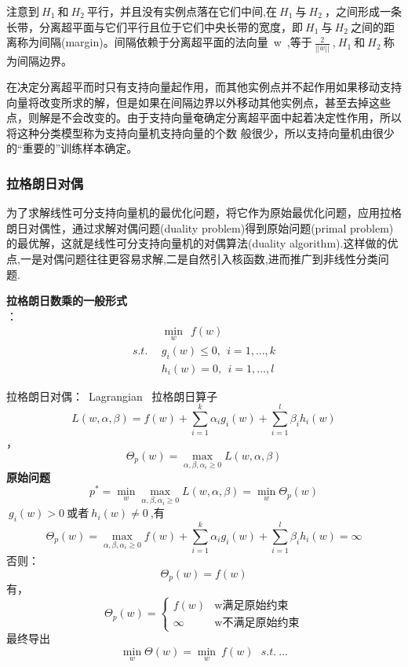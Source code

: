 注意到$~H_1~$和$~H_2~$平行，并且没有实例点落在它们中间,在$~H_1~$与$~H_2~$，之间形成一条长带，分离超平面与它们平行且位于它们中央长带的宽度，即$~H_1~$与$~H_2~$之间的距离称为间隔(margin)。间隔依赖于分离超平面的法向量~w~,等于$~\frac{2}{||w||}~$,$~H_1~$和$~H_2~$称为间隔边界。

在决定分离超平而时只有支持向量起作用，而其他实例点并不起作用如果移动支持向量将改变所求的解，但是如果在间隔边界以外移动其他实例点，甚至去掉这些点，则解是不会改变的。由于支持向量奄确定分离超平面中起着决定性作用，所以将这种分类模型称为支持向量机支持向量的个数 般很少，所以支持向量机由很少的“重要的”训练样本确定。

\subsubsection{拉格朗日对偶}
为了求解线性可分支持向量机的最优化问题，将它作为原始最优化问题，应用拉格朗日对偶性，通过求解对偶问题(duality problem)得到原始问题(primal problem)的最优解，这就是线性可分支持向量机的对偶算法(duality algorithm).这样做的优点,一是对偶问题往往更容易求解,二是自然引入核函数,进而推广到非线性分类问题.

\textbf{拉格朗日数乘的一般形式}
\\ ：
\begin{align}
            &\min \limits_w ~~f(w)   \nonumber \\
    s.t.~~  &g_i(w)\leq0,~~i=1,...,k\nonumber\\
            &h_i(w) = 0,~~i=1,...,l\nonumber
\end{align}

拉格朗日对偶：~Lagrangian~ 拉格朗日算子
$$L(w,\alpha,\beta)=f(w)+\sum_{i=1}^{k}\alpha_ig_i(w)+\sum_{i=1}^{l}\beta_ih_i(w)$$
，
$$\Theta_p(w) = \max \limits_{\alpha,\beta,\alpha_i\geq0} L(w,\alpha,\beta)$$
\indent\textbf{原始问题}
$$p^*=\min \limits_w \max \limits_{\alpha,\beta,\alpha_i\geq0} L(w,\alpha,\beta) = \min\limits_w \Theta_p(w)$$
$~g_i(w)>0~$或者$~h_i(w)\neq 0~$,有
$$\Theta_p(w) = \max \limits_{\alpha,\beta,\alpha_i\geq0} f(w)+\sum_{i=1}^{k}\alpha_ig_i(w)+\sum_{i=1}^{l}\beta_ih_i(w)=\infty $$
\indent 否则：
$$\Theta_p(w) = f(w)$$
\indent 有，
\begin{equation}\nonumber
\Theta_p(w)=
\begin{cases}
f(w)& \text{w满足原始约束}\\
\infty&\text{w不满足原始约束}
\end{cases}
\end{equation}
\indent 最终导出
$$\min \limits_w \Theta(w) = \min \limits_w ~f(w)  ~~~s.t.~ ...$$

